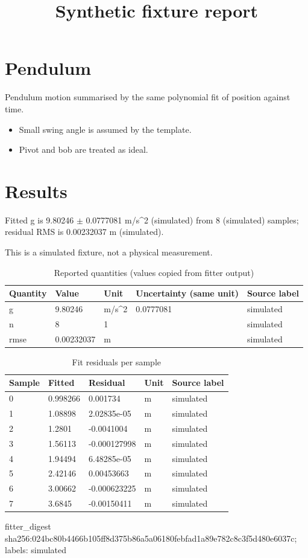 \documentclass[11pt]{article}
\title{Synthetic fixture report}
\author{}\date{}
\begin{document}
\maketitle
\section*{Pendulum}
Pendulum motion summarised by the same polynomial fit of position against time.

\begin{itemize}
\item Small swing angle is assumed by the template.
\item Pivot and bob are treated as ideal.
\end{itemize}
\section*{Results}
Fitted g is 9.80246 $\pm$ 0.0777081 m/s\textasciicircum{}2 (simulated) from 8 (simulated) samples; residual RMS is 0.00232037 m (simulated).

This is a simulated fixture, not a physical measurement.
\begin{longtable}{lllll}
\caption{Reported quantities (values copied from fitter output)}\\ \hline
Quantity & Value & Unit & Uncertainty (same unit) & Source label \\ \hline \endhead
g & 9.80246 & m/s\textasciicircum{}2 & 0.0777081 & simulated \\
n & 8 & 1 &  & simulated \\
rmse & 0.00232037 & m &  & simulated \\
\hline\end{longtable}
\begin{longtable}{lllll}
\caption{Fit residuals per sample}\\ \hline
Sample & Fitted & Residual & Unit & Source label \\ \hline \endhead
0 & 0.998266 & 0.001734 & m & simulated \\
1 & 1.08898 & 2.02835e-05 & m & simulated \\
2 & 1.2801 & -0.0041004 & m & simulated \\
3 & 1.56113 & -0.000127998 & m & simulated \\
4 & 1.94494 & 6.48285e-05 & m & simulated \\
5 & 2.42146 & 0.00453663 & m & simulated \\
6 & 3.00662 & -0.000623225 & m & simulated \\
7 & 3.6845 & -0.00150411 & m & simulated \\
\hline\end{longtable}
\noindent fitter\_digest sha256:024bc80b4466b105ff8d375b86a5a06180febfad1a89e782c8c3f5d480e6037c; labels: simulated
\end{document}
